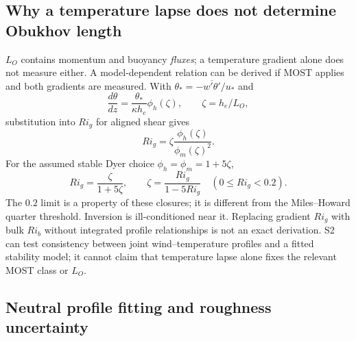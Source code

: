 \documentclass[11pt,a4paper]{article}
\numberwithin{equation}{section}
\begin{document}
\subsection{Why a temperature lapse does not determine Obukhov length}

$L_O$ contains momentum and buoyancy \emph{fluxes}; a temperature gradient
alone does not measure either. A model-dependent relation can be derived
if MOST applies and both gradients are measured. With
$\theta_*=-\overline{w'\theta'}/u_*$ and
\begin{equation}
 \frac{d\theta}{dz}=\frac{\theta_*}{\kappa h_e}\phi_h(\zeta),
 \qquad \zeta=h_e/L_O,
\end{equation}
substitution into $Ri_g$ for aligned shear gives
\begin{equation}
 Ri_g=\zeta\frac{\phi_h(\zeta)}{\phi_m(\zeta)^2}.
\end{equation}
For the assumed stable Dyer choice $\phi_h=\phi_m=1+5\zeta$,
\begin{equation}
 Ri_g=\frac{\zeta}{1+5\zeta},\qquad
 \zeta=\frac{Ri_g}{1-5Ri_g}\quad(0\leq Ri_g<0.2).
\end{equation}
The $0.2$ limit is a property of these closures; it is different from the
Miles--Howard quarter threshold. Inversion is ill-conditioned near it.
Replacing gradient $Ri_g$ with bulk $Ri_b$ without integrated profile
relationships is not an exact derivation. S2 can test consistency between
joint wind--temperature profiles and a fitted stability model; it cannot
claim that temperature lapse alone fixes the relevant MOST class or $L_O$.

\subsection{Neutral profile fitting and roughness uncertainty}
\end{document}
